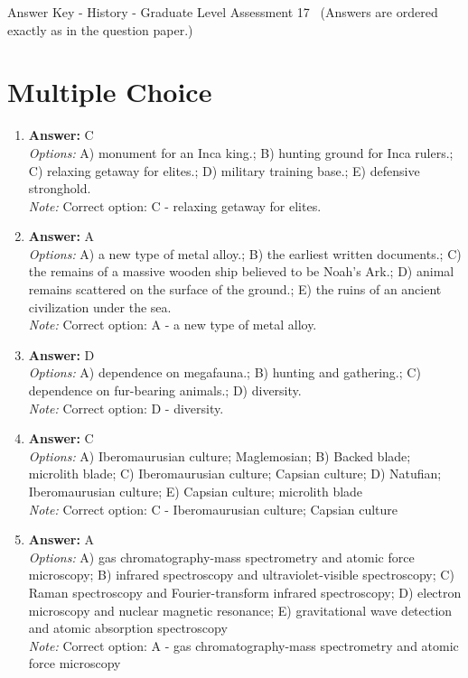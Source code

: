\documentclass[12pt]{article}
\begin{document}
\begin{center}
Answer Key - History - Graduate Level Assessment 17 \
\small (Answers are ordered exactly as in the question paper.)
\end{center}

\section*{Multiple Choice}
\begin{enumerate}[label=\arabic*.]
\item \textbf{Answer:} C
\\ \textit{Options:} A) monument for an Inca king.; B) hunting ground for Inca rulers.; C) relaxing getaway for elites.; D) military training base.; E) defensive stronghold.
\\ \textit{Note:} Correct option: C - relaxing getaway for elites.
\item \textbf{Answer:} A
\\ \textit{Options:} A) a new type of metal alloy.; B) the earliest written documents.; C) the remains of a massive wooden ship believed to be Noah's Ark.; D) animal remains scattered on the surface of the ground.; E) the ruins of an ancient civilization under the sea.
\\ \textit{Note:} Correct option: A - a new type of metal alloy.
\item \textbf{Answer:} D
\\ \textit{Options:} A) dependence on megafauna.; B) hunting and gathering.; C) dependence on fur-bearing animals.; D) diversity.
\\ \textit{Note:} Correct option: D - diversity.
\item \textbf{Answer:} C
\\ \textit{Options:} A) Iberomaurusian culture; Maglemosian; B) Backed blade; microlith blade; C) Iberomaurusian culture; Capsian culture; D) Natufian; Iberomaurusian culture; E) Capsian culture; microlith blade
\\ \textit{Note:} Correct option: C - Iberomaurusian culture; Capsian culture
\item \textbf{Answer:} A
\\ \textit{Options:} A) gas chromatography-mass spectrometry and atomic force microscopy; B) infrared spectroscopy and ultraviolet-visible spectroscopy; C) Raman spectroscopy and Fourier-transform infrared spectroscopy; D) electron microscopy and nuclear magnetic resonance; E) gravitational wave detection and atomic absorption spectroscopy
\\ \textit{Note:} Correct option: A - gas chromatography-mass spectrometry and atomic force microscopy
\end{enumerate}
\end{document}
